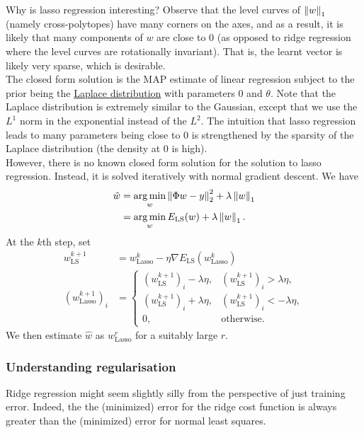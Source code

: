 \documentclass{article}
\begin{document}
			Why is lasso regression interesting? Observe that the level curves of $\left\lVert w\right\rVert_1$ (namely cross-polytopes) have many corners on the axes, and as a result, it is likely that many components of $w$ are close to $0$ (as opposed to ridge regression where the level curves are rotationally invariant). That is, the learnt vector is likely very sparse, which is desirable.\\
			The closed form solution is the MAP estimate of linear regression subject to the prior being the \href{https://en.wikipedia.org/wiki/Laplace_distribution}{Laplace distribution} with parameters $0$ and $\theta$. Note that the Laplace distribution is extremely similar to the Gaussian, except that we use the $L^1$ norm in the exponential instead of the $L^2$. The intuition that lasso regression leads to many parameters being close to $0$ is strengthened by the sparsity of the Laplace distribution (the density at $0$ is high).\\
			However, there is no known closed form solution for the solution to lasso regression. Instead, it is solved iteratively with normal gradient descent. We have
			\begin{align*}
				\hat{w} &= \operatorname*{arg\,min}_w \left\lVert\Phi w - y\right\rVert_2^2 + \lambda\left\lVert w\right\rVert_1 \\
					&= \operatorname*{arg\,min}_w E_{\text{LS}}(w) + \lambda\left\lVert w\right\rVert_1.
			\end{align*}
			At the $k$th step, set
			\begin{align*}
				w_{\text{LS}}^{k+1} &= w_{\text{Lasso}}^{k} - \eta\nabla E_\text{LS}(w_\text{Lasso}^{k}) \\
				(w_\text{Lasso}^{k+1})_{i} &=
				\begin{cases}
					(w_\text{LS}^{k+1})_i - \lambda\eta, & (w_\text{LS}^{k+1})_i > \lambda\eta, \\
					(w_\text{LS}^{k+1})_i + \lambda\eta, & (w_\text{LS}^{k+1})_i < -\lambda\eta, \\
					0, & \text{otherwise.}
				\end{cases}
			\end{align*}
			We then estimate $\hat{w}$ as $w_\text{Lasso}^r$ for a suitably large $r$.

		\subsubsection{Understanding regularisation}

			Ridge regression might seem slightly silly from the perspective of just training error. Indeed, the the (minimized) error for the ridge cost function is always greater than the (minimized) error for normal least squares.\\
\end{document}
